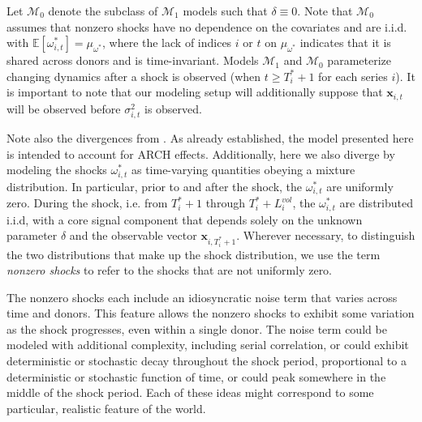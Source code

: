 \documentclass[11pt]{article}
\newcommand{\x}{\textbf{x}}
\def\mc#1{\mathcal{#1}} %
\def\E{\mathbb{E}} %
\def\mc#1{\mathcal{#1}}
\theoremstyle{definition}
\begin{document}
      Let $\mc{M}_{0}$ denote the subclass of $\mc{M}_{1}$ models such that $\delta \equiv 0$.  Note that $\mc{M}_{0}$ assumes that nonzero shocks have no dependence on the covariates and are i.i.d. with $\E[ \omega^{*}_{i,t}]=\mu_{\omega^{*}}$, where the lack of indices $i$ or $t$ on $\mu_{\omega^{*}}$ indicates that it is shared across donors and is time-invariant. Models $\mc{M}_{1}$ and $\mc{M}_{0}$ parameterize changing dynamics after a shock is observed (when $t \geq T_i^*+1$ for each series $i$). It is important to note that our modeling setup will additionally suppose that $\x_{i,t}$ will be observed before $\sigma_{i,t}^2$ is observed. 
      
  Note also the divergences from \cite{lin2021minimizing}.  As already established, the model presented here is intended to account for ARCH effects.  Additionally, here we also diverge by modeling the shocks $\omega^{*}_{i,t}$ as time-varying quantities obeying a mixture distribution.  In particular, prior to and after the shock, the  $\omega^{*}_{i,t}$  are uniformly zero.  During the shock, i.e. from $T^{*}_{i}+1$ through $T^{*}_{i}+L^{vol}_{i}$, the $\omega^{*}_{i,t}$ are distributed i.i.d, with a core signal component that depends solely on the unknown parameter $\delta$ and the observable vector $\x_{i,T_{i}^{*}+1}$.  Wherever necessary, to distinguish the two distributions that make up the shock distribution, we use the term \textit{nonzero shocks} to refer to the shocks that are not uniformly zero.  
  
  The nonzero shocks each include an idiosyncratic noise term that varies across time and donors.  This feature allows the nonzero shocks to exhibit some variation as the shock progresses, even within a single donor.  The noise term could be modeled with additional complexity, including serial correlation, or could exhibit deterministic or stochastic decay throughout the shock period, proportional to a deterministic or stochastic function of time, or could peak somewhere in the middle of the shock period.  Each of these ideas might correspond to some particular, realistic feature of the world.
  
\end{document}
